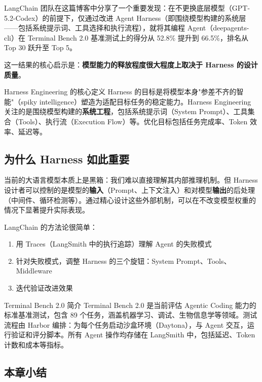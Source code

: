 \documentclass[a4paper]{article}
\begin{document}
LangChain 团队在这篇博客中分享了一个重要发现：在不更换底层模型（GPT-5.2-Codex）的前提下，仅通过改进 Agent Harness（即围绕模型构建的系统层——包括系统提示词、工具选择和执行流程），就将其编程 Agent（deepagents-cli）在 Terminal Bench 2.0 基准测试上的得分从 52.8\% 提升到 66.5\%，排名从 Top 30 跃升至 Top 5。

这一结果的核心启示是：\textbf{模型能力的释放程度很大程度上取决于 Harness 的设计质量}。

\begin{importantbox}{Harness Engineering 的核心定义}
Harness 的目标是将模型本身"参差不齐的智能"（spiky intelligence）塑造为适配目标任务的稳定能力。Harness Engineering 关注的是围绕模型构建的\textbf{系统工程}，包括系统提示词（System Prompt）、工具集合（Tools）、执行流（Execution Flow）等。优化目标包括任务完成率、Token 效率、延迟等。
\end{importantbox}

\subsection{为什么 Harness 如此重要}

当前的大语言模型本质上是黑箱：我们难以直接理解其内部推理机制。但 Harness 设计者可以控制的是模型的\textbf{输入}（Prompt、上下文注入）和对模型\textbf{输出}的后处理（中间件、循环检测等）。通过精心设计这些外部机制，可以在不改变模型权重的情况下显著提升实际表现。

LangChain 的方法论很简单：
\begin{enumerate}[leftmargin=2em]
    \item 用 Traces（LangSmith 中的执行追踪）理解 Agent 的失败模式
    \item 针对失败模式，调整 Harness 的三个旋钮：System Prompt、Tools、Middleware
    \item 迭代验证改进效果
\end{enumerate}

\begin{knowledgebox}{Terminal Bench 2.0 简介}
Terminal Bench 2.0 是当前评估 Agentic Coding 能力的标准基准测试，包含 89 个任务，涵盖机器学习、调试、生物信息学等领域。测试流程由 Harbor 编排：为每个任务启动沙盒环境（Daytona），与 Agent 交互，运行验证和评分脚本。所有 Agent 操作均存储在 LangSmith 中，包括延迟、Token 计数和成本等指标。
\end{knowledgebox}

\subsection{本章小结}
\end{document}
